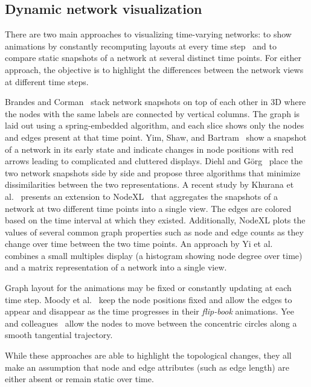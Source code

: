 \documentclass[12pt]{cmuthesis}
\begin{document}
  

  \subsection{Dynamic network visualization}

  There are two main approaches to visualizing time-varying networks: to show animations by constantly recomputing layouts at every time step~\cite{Yee2001} and to compare static snapshots of a network at several distinct time points. For either approach, the objective is to highlight the differences between the network views at different time steps.

  Brandes and Corman~\cite{Brandes2003a} stack network snapshots on top of each other in 3D where the nodes with the same labels are connected by vertical columns. The graph is laid out using a spring-embedded algorithm, and each slice shows only the nodes and edges present at that time point. Yim, Shaw, and Bartram~\cite{Yim2009} show a snapshot of a network in its early state and indicate changes in node positions with red arrows leading to complicated and cluttered displays. Diehl and G\"{o}rg~\cite{Diehl2002} place the two network snapshots side by side and propose three algorithms that minimize dissimilarities between the two representations. A recent study by Khurana et al.~\cite{Khurana2011} presents an extension to NodeXL~\cite{Bonsignore2009} that aggregates the snapshots of a network at two different time points into a single view. The edges are colored based on the time interval at which they existed. Additionally, NodeXL plots the values of several common graph properties such as node and edge counts as they change over time between the two time points. An approach by Yi et al.~\cite{Yi2010} combines a small multiples display (a histogram showing node degree over time) and a matrix representation of a network into a single view.

  Graph layout for the animations may be fixed or constantly updating at each time step. Moody et al.~\cite{Moody2005} keep the node positions fixed and allow the edges to appear and disappear as the time progresses in their \emph{flip-book} animations. Yee and colleagues~\cite{Yee2001} allow the nodes to move between the concentric circles along a smooth tangential trajectory.

  While these approaches are able to highlight the topological changes, they all make an assumption that node and edge attributes (such as edge length) are either absent or remain static over time.
\end{document}
